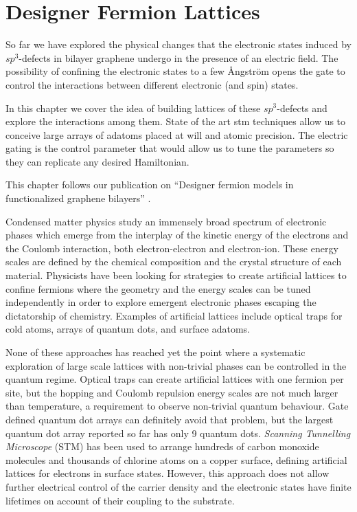 \chapter{Designer Fermion Lattices}
\label{ch:designer}
So far we have explored the physical changes that the electronic states induced by $sp^3$-defects in bilayer graphene undergo in the presence of an electric field. The possibility of confining the electronic states to a few Ångström opens the gate to control the interactions between different electronic (and spin) states.

In this chapter we cover the idea of building lattices of these $sp^3$-defects and explore the interactions among them. State of the art \ac{stm} techniques allow us to conceive large arrays of adatoms placed at will and atomic precision. The electric gating is the control parameter that would allow us to tune the parameters so they can replicate any desired Hamiltonian.

This chapter follows our publication on ``Designer fermion models in functionalized graphene bilayers'' .
\smallskip

Condensed matter physics study an immensely broad spectrum of electronic phases which emerge from the interplay of the kinetic energy of the electrons and the Coulomb interaction, both electron-electron and electron-ion. These energy scales are defined by the chemical composition and the crystal structure of each material. Physicists have been looking for strategies to create artificial lattices to confine fermions where the geometry and the energy scales can be tuned independently in order to explore emergent electronic phases escaping the dictatorship of chemistry.
Examples of artificial lattices include optical traps for cold atoms\cite{Cocchi2016}, arrays of quantum dots\cite{mortemousque2018,dehollain2019}, and surface adatoms\cite{gomes2012,drost2017,girovsky2017,khajetoorians2019}. 


None of these approaches has reached yet the point where a systematic exploration of large scale lattices with non-trivial phases can be controlled in the quantum regime.
Optical traps can create artificial lattices with one fermion per site, but the hopping and Coulomb repulsion energy scales are not much larger than temperature,\cite{Cocchi2016} a requirement to observe non-trivial quantum behaviour.
Gate defined quantum dot arrays can definitely avoid that problem\cite{dehollain2019}, but the largest quantum dot array reported so far has only 9 quantum dots\cite{mortemousque2018}.
\emph{Scanning Tunnelling Microscope} (STM) has been used to arrange hundreds of carbon monoxide molecules\cite{gomes2012} and thousands of chlorine atoms\cite{Kalff2016} on a copper surface, defining artificial lattices for electrons in surface states. However, this approach does not allow further electrical control of the carrier density and the electronic states have finite lifetimes on account of their coupling to the substrate. 

